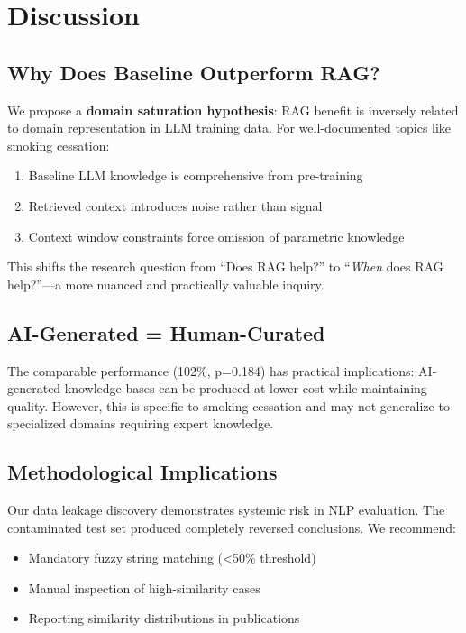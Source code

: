 \documentclass[11pt]{article}
\begin{document}
\section{Discussion}

\subsection{Why Does Baseline Outperform RAG?}

We propose a \textbf{domain saturation hypothesis}: RAG benefit is inversely related to domain representation in LLM training data. For well-documented topics like smoking cessation:

\begin{enumerate}
    \item Baseline LLM knowledge is comprehensive from pre-training
    \item Retrieved context introduces noise rather than signal
    \item Context window constraints force omission of parametric knowledge
\end{enumerate}

This shifts the research question from ``Does RAG help?'' to ``\textit{When} does RAG help?''—a more nuanced and practically valuable inquiry.

\subsection{AI-Generated = Human-Curated}

The comparable performance (102\%, p=0.184) has practical implications: AI-generated knowledge bases can be produced at lower cost while maintaining quality. However, this is specific to smoking cessation and may not generalize to specialized domains requiring expert knowledge.

\subsection{Methodological Implications}

Our data leakage discovery demonstrates systemic risk in NLP evaluation. The contaminated test set produced completely reversed conclusions. We recommend:

\begin{itemize}
    \item Mandatory fuzzy string matching (<50\% threshold)
    \item Manual inspection of high-similarity cases
    \item Reporting similarity distributions in publications
\end{itemize}
\end{document}
